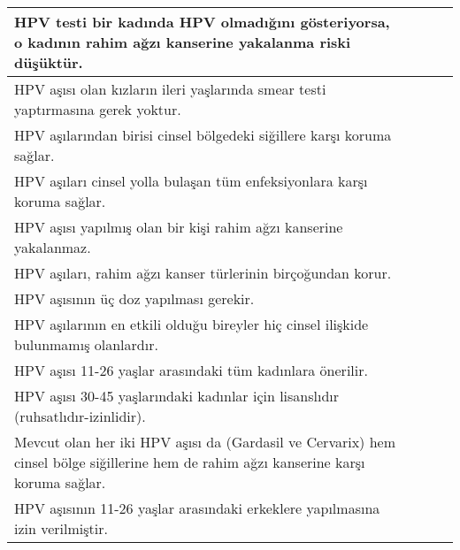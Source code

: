 \documentclass[turkish]{article}
\begin{document}
\begin{longtable}{|m{10cm}|c|c|c|}
    HPV testi bir kadında HPV olmadığını gösteriyorsa, o kadının rahim ağzı kanserine yakalanma riski düşüktür. & & & \\ \hline
    HPV aşısı olan kızların ileri yaşlarında smear testi yaptırmasına gerek yoktur. & & & \\ \hline
    HPV aşılarından birisi cinsel bölgedeki siğillere karşı koruma sağlar. & & & \\ \hline
    HPV aşıları cinsel yolla bulaşan tüm enfeksiyonlara karşı koruma sağlar. & & & \\ \hline
    HPV aşısı yapılmış olan bir kişi rahim ağzı kanserine yakalanmaz. & & & \\ \hline
    HPV aşıları, rahim ağzı kanser türlerinin birçoğundan korur. & & & \\ \hline
    HPV aşısının üç doz yapılması gerekir. & & & \\ \hline
    HPV aşılarının en etkili olduğu bireyler hiç cinsel ilişkide bulunmamış olanlardır. & & & \\ \hline
    HPV aşısı 11-26 yaşlar arasındaki tüm kadınlara önerilir. & & & \\ \hline
    HPV aşısı 30-45 yaşlarındaki kadınlar için lisanslıdır (ruhsatlıdır-izinlidir). & & & \\ \hline
    Mevcut olan her iki HPV aşısı da (Gardasil ve Cervarix) hem cinsel bölge siğillerine hem de rahim ağzı kanserine karşı koruma sağlar. & & & \\ \hline
    HPV aşısının 11-26 yaşlar arasındaki erkeklere yapılmasına izin verilmiştir. & & & \\ \hline
\end{longtable}
\end{document}
